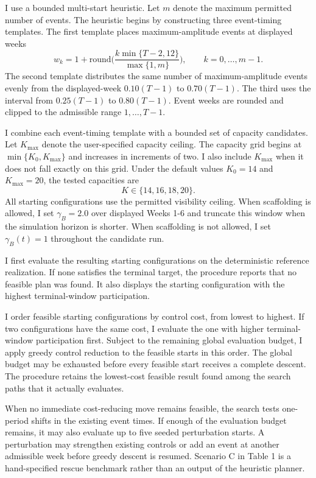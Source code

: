 \documentclass[11pt]{article}
\begin{document}
I use a bounded multi-start heuristic. Let $m$ denote the maximum permitted number of events. The heuristic begins by constructing three event-timing templates. The first template places maximum-amplitude events at displayed weeks
\[
w_k=1+\text{round}\bigg(\frac{k\min\{T-2,12\}}{\max\{1,m\}}\bigg), \qquad
k=0,\ldots,m-1.
\]
The second template distributes the same number of maximum-amplitude events evenly from the displayed-week $0.10(T-1)$ to $0.70(T-1)$. The third uses the interval from $0.25(T-1)$ to $0.80(T-1)$. Event weeks are rounded and clipped to the admissible range $1,\ldots,T-1$. 

I combine each event-timing template with a bounded set of capacity candidates. Let $K_{\max}$ denote the user-specified capacity ceiling. The capacity grid begins at $\min\{K_0, K_{\max}\}$ and increases in increments of two. I also include $K_{\max}$ when it does not fall exactly on this grid. Under the default values $K_0=14$ and $K_{\max}=20$, the tested capacities are
\[
K\in\{14,16,18,20\}.
\]
All starting configurations use the permitted visibility ceiling. When scaffolding is allowed, I set $\gamma_B=2.0$ over displayed Weeks 1-6 and truncate this window when the simulation horizon is shorter. When scaffolding is not allowed, I set $\gamma_B(t)=1$ throughout the candidate run.

I first evaluate the resulting starting configurations on the deterministic reference realization. If none satisfies the terminal target, the procedure reports that no feasible plan was found. It also displays the starting configuration with the highest terminal-window participation.

I order feasible starting configurations by control cost, from lowest to highest. If two configurations have the same cost, I evaluate the one with higher terminal-window participation first. Subject to the remaining global evaluation budget, I apply greedy control reduction to the feasible starts in this order. The global budget may be exhausted before every feasible start receives a complete descent. The procedure retains the lowest-cost feasible result found among the search paths that it actually evaluates.

When no immediate cost-reducing move remains feasible, the search tests one-period shifts in the existing event times. If enough of the evaluation budget remains, it may also evaluate up to five seeded perturbation starts. A perturbation may strengthen existing controls or add an event at another admissible week before greedy descent is resumed. Scenario C in Table 1 is a hand-specified rescue benchmark rather than an output of the heuristic planner.
\end{document}
